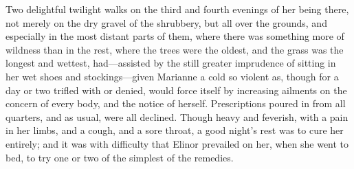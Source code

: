 Two delightful twilight walks on the third and fourth evenings of her being there, not merely on the dry gravel of the shrubbery, but all over the grounds, and especially in the most distant parts of them, where there was something more of wildness than in the rest, where the trees were the oldest, and the grass was the longest and wettest, had—assisted by the still greater imprudence of sitting in her wet shoes and stockings—given Marianne a cold so violent as, though for a day or two trifled with or denied, would force itself by increasing ailments on the concern of every body, and the notice of herself. Prescriptions poured in from all quarters, and as usual, were all declined. Though heavy and feverish, with a pain in her limbs, and a cough, and a sore throat, a good night’s rest was to cure her entirely; and it was with difficulty that Elinor prevailed on her, when she went to bed, to try one or two of the simplest of the remedies.